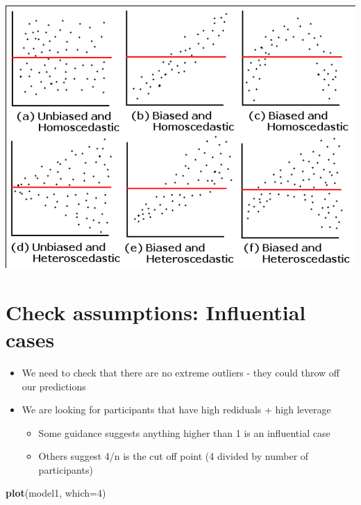 \documentclass[
]{book}
\newenvironment{Shaded}{\begin{snugshade}}{\end{snugshade}}
\newcommand{\DataTypeTok}[1]{\textcolor[rgb]{0.13,0.29,0.53}{#1}}
\newcommand{\DecValTok}[1]{\textcolor[rgb]{0.00,0.00,0.81}{#1}}
\newcommand{\KeywordTok}[1]{\textcolor[rgb]{0.13,0.29,0.53}{\textbf{#1}}}
\newcommand{\NormalTok}[1]{#1}
\providecommand{\tightlist}{%
  \setlength{\itemsep}{0pt}\setlength{\parskip}{0pt}}
\begin{document}
\begin{center}\includegraphics[width=13.78in,height=1\textheight]{img/biasedresiduals} \end{center}

\hypertarget{check-assumptions-influential-cases}{%
\section{Check assumptions: Influential cases}\label{check-assumptions-influential-cases}}

\begin{itemize}
\tightlist
\item
  We need to check that there are no extreme outliers - they could throw off our predictions
\item
  We are looking for participants that have high rediduals + high leverage

  \begin{itemize}
  \tightlist
  \item
    Some guidance suggests anything higher than 1 is an influential case
  \item
    Others suggest 4/n is the cut off point (4 divided by number of participants)
  \end{itemize}
\end{itemize}

\begin{Shaded}
\begin{Highlighting}[]
\KeywordTok{plot}\NormalTok{(model1, }\DataTypeTok{which=}\DecValTok{4}\NormalTok{)}
\end{Highlighting}
\end{Shaded}
\end{document}

